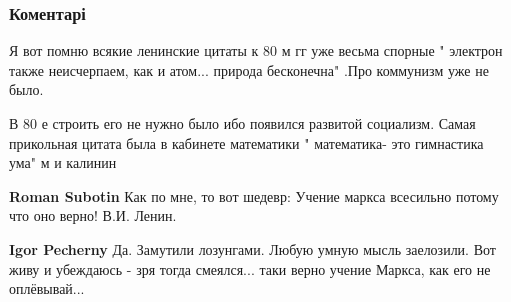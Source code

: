  
 
 
 
 
\subsubsection{Коментарі}


\begin{itemize}

Я вот помню всякие ленинские цитаты к 80 м гг уже весьма спорные " электрон
также неисчерпаем, как и атом... природа бесконечна" .Про коммунизм уже не было.

В 80 е строить его не нужно было ибо появился развитой социализм. Самая
прикольная цитата была в кабинете математики " математика- это гимнастика ума"
м и калинин

\begin{itemize}


\textbf{Roman Subotin} Как по мне, то вот шедевр:
Учение маркса всесильно потому что оно верно!
В.И. Ленин.

\begin{itemize}
 
\textbf{Igor Pecherny} Да. Замутили лозунгами. Любую умную мысль заелозили. Вот
живу и убеждаюсь - зря тогда смеялся... таки верно учение Маркса, как его не
оплёвывай...


 


\end{itemize}
\end{itemize}
\end{itemize}
